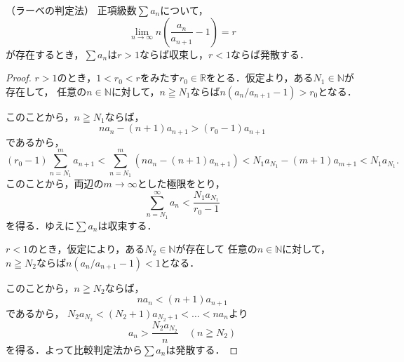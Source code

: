\begin{lemma}{（ラーベの判定法）}{}
    正項級数$\sum a_n$について，
    \[
        \lim_{n\to\infty} n \left(\frac{a_n}{a_{n+1}}-1 \right) = r
    \]
    が存在するとき，$\sum a_n$は$r >1$ならば収束し，$r < 1$ならば発散する．
\end{lemma}

\begin{proof}
    $r>1$のとき，$ 1< r_0 < r$をみたす$r_0 \in \mathbb{R}$をとる．仮定より，ある$N_1 \in \mathbb{N}$が存在して，
    任意の$n \in \mathbb{N}$に対して，$n \geqq N_1$ならば$n (a_n/a_{n+1}-1) > r_0$となる．

    このことから，$ n \geqq N_1$ならば，
    \[
        n a_n -(n+1)a_{n+1} > (r_0-1) a_{n+1}
    \]
    であるから，
    \[
        (r_0-1) \sum_{n=N_1}^{m} a_{n+1}  < \sum_{n=N_1}^{m} (n a_n - (n+1) a_{n+1})
        <N_1 a_{N_1} - (m+1) a_{m+1}
        < N_1 a_{N_1}.
    \]
    このことから，両辺の$m \to \infty$とした極限をとり，
    \[
        \sum_{n=N_1}^{\infty} a_n <\frac{N_1 a_{N_1}}{r_0-1}
    \]
    を得る．ゆえに$\sum a_n$は収束する．

    $r < 1$のとき，仮定により，ある$N_2 \in \mathbb{N}$が存在して
    任意の$n \in \mathbb{N}$に対して，$n \geqq N_2$ならば$n(a_n/a_{n+1}-1) < 1$となる．

    このことから，$n \geqq N_2$ならば，
    \[
        n a_n < (n+1) a_{n+1}
    \]
    であるから， $N_2 a_{N_2} < (N_2 +1)a_{N_2+1} <  \dots< n a_n $より
    \[
        a_n > \frac{N_2 a_{N_2}}{n} \quad (n \geqq N_2)
    \]
    を得る．よって比較判定法から$\sum a_n$は発散する．
\end{proof}


